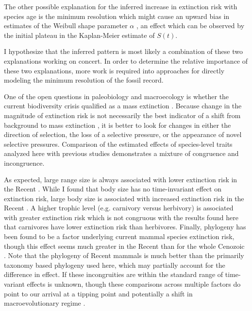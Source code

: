 \documentclass[12pt]{article}
\begin{document}
The other possible explanation for the inferred increase in extinction risk with species age is the minimum resolution which might cause an upward bias in estimates of the Weibull shape parameter \(\alpha\) \cite{Sepkoski1975}, an effect which can be observed by the initial plateau in the Kaplan-Meier estimate of $S(t)$. 

I hypothesize that the inferred pattern is most likely a combination of these two explanations working on concert. In order to determine the relative importance of these two explanations, more work is required into approaches for directly modeling the minimum resolution of the fossil record.

One of the open questions in paleobiology and macroecology is whether the current biodiversity crisis qualified as a mass extinction \cite{Alroy2010,Barnosky2011,Barnosky2012a}. Because change in the magnitude of extinction risk is not necessarily the best indicator of a shift from background to mass extinction \cite{Wang2003}, it is better to look for changes in either the direction of selection, the loss of a selective pressure, or the appearance of novel selective pressures. Comparison of the estimated effects of species-level traits analyzed here with previous studies demonstrates a mixture of congruence and incongruence. 

As expected, large range size is always associated with lower extinction risk in the Recent \cite{Fritz2009,Fritz2010b,Liow2009,Purvis2000a}. While I found that body size has no time-invariant effect on extinction risk, large body size is associated with increased extinction risk in the Recent \cite{Liow2009,Fritz2009,Purvis2000a}. A higher trophic level (e.g. carnivory versus herbivory) is associated with greater extinction risk \cite{Purvis2000a} which is not congruous with the results found here that carnivores have lower extinction risk than herbivores. Finally, phylogeny has been found to be a factor underlying current mammal species extinction risk, though this effect seems much greater in the Recent than for the whole Cenozoic \cite{Fritz2010b}. Note that the phylogeny of Recent mammals is much better than the primarily taxonomy based phylogeny used here, which may partially account for the difference in effect. If these incongruities are within the standard range of time-variant effects is unknown, though these comparisons across multiple factors do point to our arrival at a tipping point \cite{Barnosky2012a,Barnosky2011} and potentially a shift in macroevolutionary regime \cite{Jablonski1986}.
\end{document}
